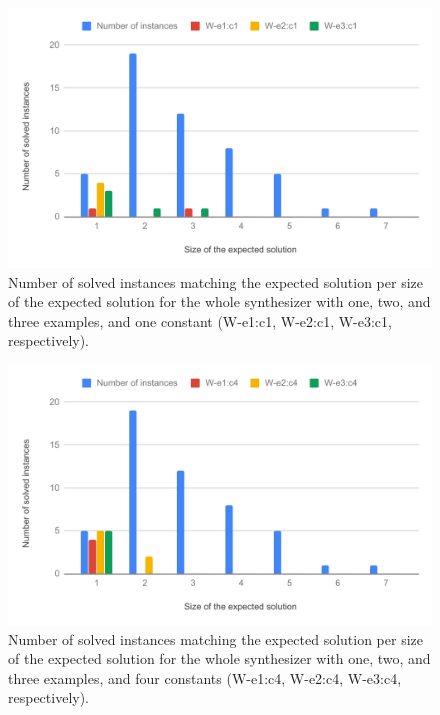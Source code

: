 \begin{figure}
  \centering
  \includegraphics[width=1.0\textwidth]{assets/bar-chart-expected-whole-c1.pdf}
  \caption{Number of solved instances matching the expected solution per size of
    the expected solution for the whole synthesizer with one, two, and three
    examples, and one constant (W-e1:c1, W-e2:c1, W-e3:c1, respectively).}
  \label{fig:bar-chart-expected-whole-c1}
\end{figure}

\begin{figure}
  \centering
  \includegraphics[width=1.0\textwidth]{assets/bar-chart-expected-whole-c4.pdf}
  \caption{Number of solved instances matching the expected solution per size of
    the expected solution for the whole synthesizer with one, two, and three
    examples, and four constants (W-e1:c4, W-e2:c4, W-e3:c4, respectively).}
  \label{fig:bar-chart-expected-whole-c4}
\end{figure}


